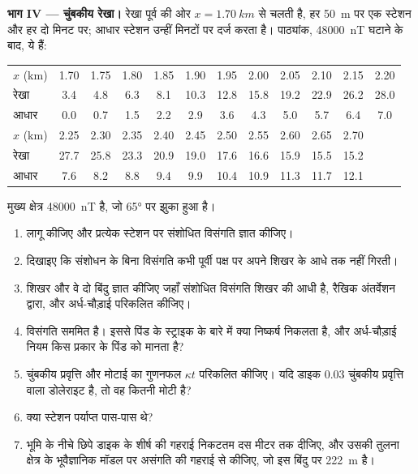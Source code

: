 \begin{problem}
\medskip\noindent\textbf{भाग IV --- चुंबकीय रेखा।} रेखा
पूर्व की ओर $x = \qty{1.70}{km}$ से चलती है, हर \qty{50}{m} पर एक स्टेशन और हर
दो मिनट पर; आधार स्टेशन उन्हीं मिनटों पर दर्ज करता है। पाठ्यांक,
\qty{48000}{nT} घटाने के बाद, ये हैं:
\begin{center}
\small
\setlength{\tabcolsep}{3.5pt}
\begin{tabular}{lccccccccccc}
\hline
$x$ (km) & 1.70 & 1.75 & 1.80 & 1.85 & 1.90 & 1.95 & 2.00 & 2.05 & 2.10 & 2.15 & 2.20 \\
रेखा & 3.4 & 4.8 & 6.3 & 8.1 & 10.3 & 12.8 & 15.8 & 19.2 & 22.9 & 26.2 & 28.0 \\
आधार & 0.0 & 0.7 & 1.5 & 2.2 & 2.9 & 3.6 & 4.3 & 5.0 & 5.7 & 6.4 & 7.0 \\
\hline
$x$ (km) & 2.25 & 2.30 & 2.35 & 2.40 & 2.45 & 2.50 & 2.55 & 2.60 & 2.65 & 2.70 & \\
रेखा & 27.7 & 25.8 & 23.3 & 20.9 & 19.0 & 17.6 & 16.6 & 15.9 & 15.5 & 15.2 & \\
आधार & 7.6 & 8.2 & 8.8 & 9.4 & 9.9 & 10.4 & 10.9 & 11.3 & 11.7 & 12.1 & \\
\hline
\end{tabular}
\end{center}
मुख्य क्षेत्र \qty{48000}{nT} है, जो \ang{65} पर झुका हुआ है।
\begin{enumerate}[resume]
\item {} लागू कीजिए और प्रत्येक स्टेशन पर
  संशोधित विसंगति ज्ञात कीजिए।
\item दिखाइए कि संशोधन के बिना विसंगति कभी
  पूर्वी पक्ष पर अपने शिखर के आधे तक नहीं गिरती।
\item शिखर और वे दो बिंदु ज्ञात कीजिए जहाँ संशोधित विसंगति
  शिखर की आधी है, रैखिक अंतर्वेशन द्वारा, और अर्ध-चौड़ाई परिकलित कीजिए।
\item विसंगति सममित है। इससे पिंड के स्ट्राइक के बारे में
  क्या निष्कर्ष निकलता है, और अर्ध-चौड़ाई नियम किस प्रकार के पिंड को मानता है?
\item चुंबकीय प्रवृत्ति और मोटाई का गुणनफल $\kappa t$ परिकलित कीजिए।
  यदि डाइक \num{0.03} चुंबकीय प्रवृत्ति वाला डोलेराइट है, तो वह
  कितनी मोटी है?
\item क्या स्टेशन पर्याप्त पास-पास थे?
\item भूमि के नीचे छिपे डाइक के शीर्ष की गहराई
  निकटतम दस मीटर तक दीजिए, और उसकी तुलना क्षेत्र के भूवैज्ञानिक मॉडल
  पर असंगति की गहराई से कीजिए, जो इस
  बिंदु पर \qty{222}{m} है।
\end{enumerate}
\end{problem}
